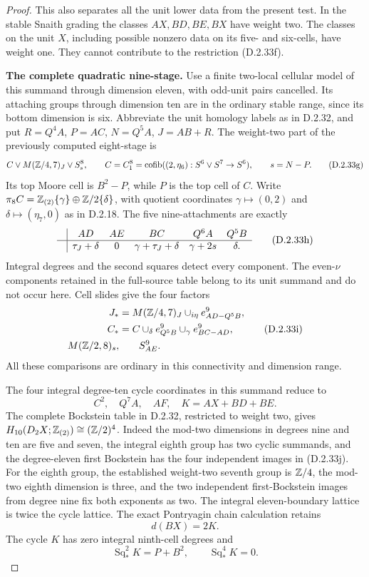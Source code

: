\begin{proof}
This also separates all the unit lower data from the present
test. In the stable Snaith grading the classes
$AX,BD,BE,BX$ have weight two. The classes on the unit
$X$, including possible nonzero data on its five- and
six-cells, have weight one. They cannot contribute to the
restriction \textup{(D.2.33f)}.

\medskip\noindent
\textbf{The complete quadratic nine-stage.}
Use a finite two-local cellular model of this summand through
dimension eleven, with odd-unit pairs cancelled. Its attaching
groups through dimension ten are in the ordinary stable range,
since its bottom dimension is six. Abbreviate the unit homology
labels as in \textup{D.2.32}, and put
$R=Q^4A$, $P=AC$, $N=Q^5A$, $J=AB+R$.
The weight-two part of the previously computed eight-stage is
\[
 C\vee M(\mathbb Z/4,7)_J\vee S^8_s,
 \qquad
 C=C_1^8=\operatorname{cofib}((2,\eta_6):S^6\vee S^7\to S^6),
 \qquad s=N-P.
 \tag{D.2.33g}
\]
Its top Moore cell is $B^2-P$, while $P$ is the top cell
of $C$. Write
$\pi_8C=\mathbb Z_{(2)}\{\gamma\}\oplus\mathbb Z/2\{\delta\}$,
with quotient coordinates $\gamma\mapsto(0,2)$ and
$\delta\mapsto(\eta_7,0)$ as in \textup{D.2.18}.
The five nine-attachments are exactly
\[
\begin{array}{c|ccccc}
 &AD&AE&BC&Q^6A&Q^5B\\\hline
 &\tau_J+\delta&0&\gamma+\tau_J+\delta&
                    \gamma+2s&\delta.
\end{array}
 \tag{D.2.33h}
\]
Integral degrees and the second squares detect every component.
The even-$\nu$ components retained in the full-source table
belong to its unit summand and do not occur here. Cell slides
give the four factors
\[
\begin{split}
 J_*&=M(\mathbb Z/4,7)_J\cup_{i\eta}e^9_{AD-Q^5B},\\
 C_*&=C\cup_\delta e^9_{Q^5B}
                    \cup_\gamma e^9_{BC-AD},\\
 M(\mathbb Z/2,8)_s,&\qquad S^9_{AE}.
\end{split}
 \tag{D.2.33i}
\]
All these comparisons are ordinary in this connectivity and
dimension range.

The four integral degree-ten cycle coordinates in this
summand reduce to
\[
             C^2,\quad Q^7A,\quad AF,\quad
                    K=AX+BD+BE.
 \tag{D.2.33j}
\]
The complete Bockstein table in \textup{D.2.32}, restricted
to weight two, gives
$H_{10}(D_2X;\mathbb Z_{(2)})\cong(\mathbb Z/2)^4$.
Indeed the mod-two dimensions in degrees nine and ten are
five and seven, the integral eighth group has two cyclic
summands, and the degree-eleven first Bockstein has the four
independent images in \textup{(D.2.33j)}.
For the eighth group, the established weight-two seventh
group is $\mathbb Z/4$, the mod-two eighth dimension is three,
and the two independent first-Bockstein images from degree
nine fix both exponents as two.
The integral eleven-boundary lattice is twice the cycle lattice.
The exact Pontryagin chain calculation retains
\[
                 d(BX)=2K.
 \tag{D.2.33k}
\]
The cycle $K$ has zero integral ninth-cell degrees and
\[
        \operatorname{Sq}_*^2K=P+B^2,
                  \qquad \operatorname{Sq}_*^4K=0.
 \tag{D.2.33l}
\]


\end{proof}
